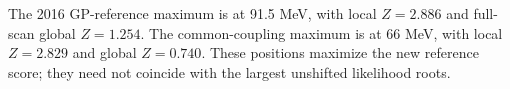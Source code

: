 The 2016 GP-reference maximum is at 91.5 MeV, with local $Z=2.886$ and full-scan global $Z=1.254$. The common-coupling maximum is at 66 MeV, with local $Z=2.829$ and global $Z=0.740$. These positions maximize the new reference score; they need not coincide with the largest unshifted likelihood roots.
